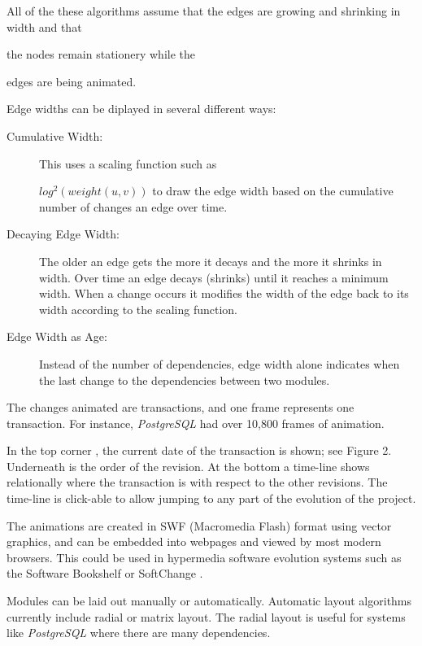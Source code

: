 \documentclass[times, 10pt,twocolumn]{article}
\newcommand{\postgresql}{\emph{PostgreSQL}\xspace}
\begin{document}
All of the these algorithms assume that the edges are growing and shrinking
in width and that 

the nodes remain stationery while the 

edges are being animated.

Edge widths can be diplayed in several different ways:
\begin{description}
\item[Cumulative Width:] This uses a scaling function such as

    $log^2(weight(u,v))$ to draw the edge width based on
        the cumulative number of changes an edge over time.
    
    
    
    
\item[Decaying Edge Width:] The older an edge gets the more it decays and the
    more it shrinks in width.  Over time an edge decays (shrinks) until it
    reaches a minimum width. When a change occurs it modifies the width of
    the edge back to its width according to the scaling function. 
\item[Edge Width as Age:] Instead of the number of dependencies, edge width
    alone indicates when the last change to the dependencies between two
    modules.
\end{description}

The changes animated are transactions, and one frame represents one
transaction. For instance, \postgresql had over 10,800 frames of animation.

In the top corner , the current date of the transaction is shown; see Figure 2.
Underneath is the order of the revision. At the bottom a time-line
shows relationally where the transaction is with respect to the other
revisions. The time-line is click-able to allow jumping to any part of the
evolution of the project.

The animations are created in SWF (Macromedia Flash) format using vector
graphics, and can be embedded into webpages and viewed by most modern
browsers.  This could be used in   hypermedia software evolution
systems such as the  Software Bookshelf \cite{pbs} or SoftChange
\cite{dmgseke2004}. 

Modules can be laid out manually or automatically. Automatic layout
algorithms currently include radial or matrix layout. The radial layout is
useful for systems like \postgresql where there are many dependencies.
\end{document}
